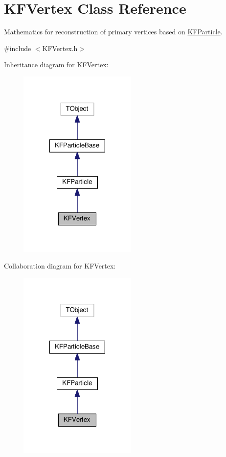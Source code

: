 \hypertarget{classKFVertex}{}\section{K\+F\+Vertex Class Reference}
\label{classKFVertex}


Mathematics for reconstruction of primary vertices based on \hyperlink{classKFParticle}{K\+F\+Particle}.  




{\ttfamily \#include $<$K\+F\+Vertex.\+h$>$}



Inheritance diagram for K\+F\+Vertex\+:
\nopagebreak
\begin{figure}[H]
\begin{center}
\leavevmode
\includegraphics[width=165pt]{classKFVertex__inherit__graph}
\end{center}
\end{figure}


Collaboration diagram for K\+F\+Vertex\+:
\nopagebreak
\begin{figure}[H]
\begin{center}
\leavevmode
\includegraphics[width=165pt]{classKFVertex__coll__graph}
\end{center}
\end{figure}
